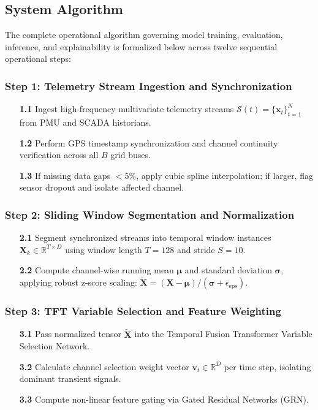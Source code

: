 \documentclass[12pt,a4paper]{report}
\begin{document}
\subsection{System Algorithm}
The complete operational algorithm governing model training, evaluation, inference, and explainability is formalized below across twelve sequential operational steps:

\subsubsection*{Step 1: Telemetry Stream Ingestion and Synchronization}
\begin{enumerate}
  \item[\textbf{1.1}] Ingest high-frequency multivariate telemetry streams $\mathcal{S}(t) = \{\mathbf{x}_t\}_{t=1}^N$ from PMU and SCADA historians.
  \item[\textbf{1.2}] Perform GPS timestamp synchronization and channel continuity verification across all $B$ grid buses.
  \item[\textbf{1.3}] If missing data gaps $<5$\%, apply cubic spline interpolation; if larger, flag sensor dropout and isolate affected channel.
\end{enumerate}

\subsubsection*{Step 2: Sliding Window Segmentation and Normalization}
\begin{enumerate}
  \item[\textbf{2.1}] Segment synchronized streams into temporal window instances $\mathbf{X}_k \in \mathbb{R}^{T \times D}$ using window length $T=128$ and stride $S=10$.
  \item[\textbf{2.2}] Compute channel-wise running mean $\boldsymbol{\mu}$ and standard deviation $\boldsymbol{\sigma}$, applying robust z-score scaling: $\tilde{\mathbf{X}} = (\mathbf{X} - \boldsymbol{\mu}) / (\boldsymbol{\sigma} + \epsilon_{\text{eps}})$.
\end{enumerate}

\subsubsection*{Step 3: TFT Variable Selection and Feature Weighting}
\begin{enumerate}
  \item[\textbf{3.1}] Pass normalized tensor $\tilde{\mathbf{X}}$ into the Temporal Fusion Transformer Variable Selection Network.
  \item[\textbf{3.2}] Calculate channel selection weight vector $\mathbf{v}_t \in \mathbb{R}^D$ per time step, isolating dominant transient signals.
  \item[\textbf{3.3}] Compute non-linear feature gating via Gated Residual Networks (GRN).
\end{enumerate}
\end{document}
